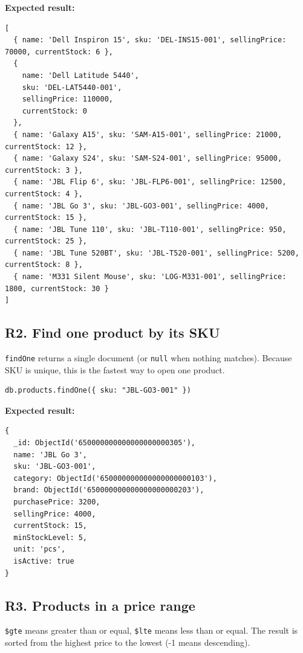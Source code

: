 \documentclass[11pt,a4paper]{article}
\newcommand{\code}[1]{\texttt{#1}}
\begin{document}
\noindent\textbf{Expected result:}
\begin{lstlisting}[style=result]
[
  { name: 'Dell Inspiron 15', sku: 'DEL-INS15-001', sellingPrice: 70000, currentStock: 6 },
  {
    name: 'Dell Latitude 5440',
    sku: 'DEL-LAT5440-001',
    sellingPrice: 110000,
    currentStock: 0
  },
  { name: 'Galaxy A15', sku: 'SAM-A15-001', sellingPrice: 21000, currentStock: 12 },
  { name: 'Galaxy S24', sku: 'SAM-S24-001', sellingPrice: 95000, currentStock: 3 },
  { name: 'JBL Flip 6', sku: 'JBL-FLP6-001', sellingPrice: 12500, currentStock: 4 },
  { name: 'JBL Go 3', sku: 'JBL-GO3-001', sellingPrice: 4000, currentStock: 15 },
  { name: 'JBL Tune 110', sku: 'JBL-T110-001', sellingPrice: 950, currentStock: 25 },
  { name: 'JBL Tune 520BT', sku: 'JBL-T520-001', sellingPrice: 5200, currentStock: 8 },
  { name: 'M331 Silent Mouse', sku: 'LOG-M331-001', sellingPrice: 1800, currentStock: 30 }
]
\end{lstlisting}

\subsection*{R2. Find one product by its SKU}
\code{findOne} returns a single document (or \code{null} when nothing matches). Because SKU is unique, this is the fastest way to open one product.

\begin{minipage}{\linewidth}
\begin{lstlisting}[style=query]
db.products.findOne({ sku: "JBL-GO3-001" })
\end{lstlisting}
\end{minipage}

\noindent\textbf{Expected result:}
\begin{lstlisting}[style=result]
{
  _id: ObjectId('650000000000000000000305'),
  name: 'JBL Go 3',
  sku: 'JBL-GO3-001',
  category: ObjectId('650000000000000000000103'),
  brand: ObjectId('650000000000000000000203'),
  purchasePrice: 3200,
  sellingPrice: 4000,
  currentStock: 15,
  minStockLevel: 5,
  unit: 'pcs',
  isActive: true
}
\end{lstlisting}

\subsection*{R3. Products in a price range}
\code{\$gte} means greater than or equal, \code{\$lte} means less than or equal. The result is sorted from the highest price to the lowest (-1 means descending).
\end{document}
